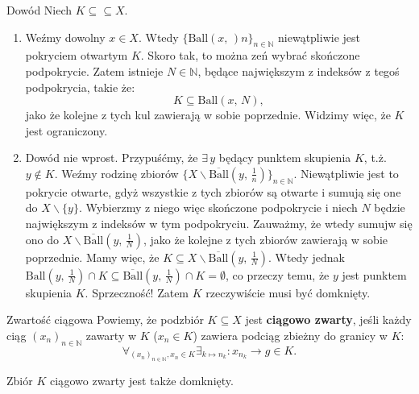 \documentclass{article}
\numberwithin{defi}{section}
\numberwithin{defi}{section}
\newcommand{\N}{\mathbb{N}}
\newcommand{\ciag}[1]{(#1_{n})_{n \in \N}}
\newcommand{\ball}[2]{\text{Ball}(#1, \, #2)}
\newcommand{\dball}[2]{\overline{\text{Ball}}(#1, \, #2)}
\begin{document}
    \begin{dow}{Dowód}
        Niech $K \subseteq \subseteq X$.
        \begin{enumerate}
            \item Weźmy dowolny $x \in X$. Wtedy $\{ \ball{x}{}n \}_{n \in \N} $ niewątpliwie jest pokryciem otwartym $K$. Skoro tak, to można zeń wybrać skończone podpokrycie. Zatem istnieje $N \in \N$, będące największym z indeksów z tegoś podpokrycia, takie że: \begin{equation*}
                K \subseteq \ball{x}{N},
            \end{equation*} jako że kolejne z tych kul zawierają w sobie poprzednie. Widzimy więc, że $K$ jest ograniczony.

            \item Dowód nie wprost. Przypuśćmy, że $\exists \, y$ będący punktem skupienia $K$, t.ż. $y \notin K$. Weźmy rodzinę zbiorów $\{ X \backslash \dball{y}{\frac{1}{n}} \}_{n \in \N}$. Niewątpliwie jest to pokrycie otwarte, gdyż wszystkie z tych zbiorów są otwarte i sumują się one do $X \backslash \{y\}$. Wybierzmy z niego więc skończone podpokrycie i niech $N$ będzie największym z indeksów w tym podpokryciu. Zauważmy, że wtedy sumujw się ono do $X \backslash \dball{y}{\frac{1}{N}}$, jako że kolejne z tych zbiorów zawierają w sobie poprzednie. Mamy więc, że $K \subseteq X \backslash \dball{y}{\frac{1}{N}}$. Wtedy jednak $ \ball{y}{\frac{1}{N}} \cap K \subseteq \dball{y}{\frac{1}{N}} \cap K = \emptyset$, co przeczy temu, że $y$ jest punktem skupienia $K$. Sprzeczność! Zatem $K$ rzeczywiście musi być domknięty.
        \end{enumerate}
    \end{dow}

    \begin{defr}{Zwartość ciągowa} \label{defr:zwartosc-ciagowa}
        Powiemy, że podzbiór $K \subseteq X$ jest \textbf{ciągowo zwarty}, jeśli każdy ciąg $\ciag{x}$ zawarty w $K$ ($x_n \in K$) zawiera podciąg zbieżny do granicy w $K$: \begin{equation}
            \forall_{\ciag{x}, x_n \in K} \exists_{k \mapsto n_k}: x_{n_k} \to g \in K.
        \end{equation}
    \end{defr}

    \begin{twier}{}\label{twier:ciag-zwarty-domk}
        Zbiór $K$ ciągowo zwarty jest także domknięty.
    \end{twier}
\end{document}
